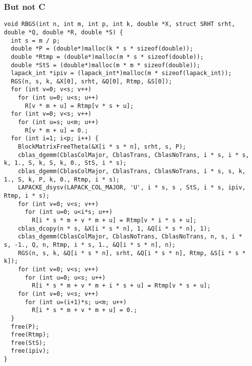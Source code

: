 \documentclass[t,usepdftitle=false]{beamer}
\begin{document}
\begin{frame}[fragile]
	\frametitle{But not C}
	\tiny
\begin{verbatim}
void RBGS(int n, int m, int p, int k, double *X, struct SRHT srht, double *Q, double *R, double *S) {
  int s = m / p;
  double *P = (double*)malloc(k * s * sizeof(double));
  double *Rtmp = (double*)malloc(m * s * sizeof(double));
  double *StS = (double*)malloc(m * m * sizeof(double));
  lapack_int *ipiv = (lapack_int*)malloc(m * sizeof(lapack_int));
  RGS(n, s, k, &X[0], srht, &Q[0], Rtmp, &S[0]);
  for (int v=0; v<s; v++)
    for (int u=0; u<s; u++)
      R[v * m + u] = Rtmp[v * s + u];
  for (int v=0; v<s; v++)
    for (int u=s; u<m; u++)
      R[v * m + u] = 0.;
  for (int i=1; i<p; i++) {
    BlockMatrixFreeTheta(&X[i * s * n], srht, s, P);
    cblas_dgemm(CblasColMajor, CblasTrans, CblasNoTrans, i * s, i * s, k, 1., S, k, S, k, 0., StS, i * s);
    cblas_dgemm(CblasColMajor, CblasTrans, CblasNoTrans, i * s, s, k, 1., S, k, P, k, 0., Rtmp, i * s);
    LAPACKE_dsysv(LAPACK_COL_MAJOR, 'U', i * s, s , StS, i * s, ipiv, Rtmp, i * s);
    for (int v=0; v<s; v++)
      for (int u=0; u<i*s; u++)
        R[i * s * m + v * m + u] = Rtmp[v * i * s + u];
    cblas_dcopy(n * s, &X[i * s * n], 1, &Q[i * s * n], 1);
    cblas_dgemm(CblasColMajor, CblasNoTrans, CblasNoTrans, n, s, i * s, -1., Q, n, Rtmp, i * s, 1., &Q[i * s * n], n);
    RGS(n, s, k, &Q[i * s * n], srht, &Q[i * s * n], Rtmp, &S[i * s * k]);
    for (int v=0; v<s; v++)
      for (int u=0; u<s; u++)
        R[i * s * m + v * m + i * s + u] = Rtmp[v * s + u];
    for (int v=0; v<s; v++)
      for (int u=(i+1)*s; u<m; u++)
        R[i * s * m + v * m + u] = 0.;
  }
  free(P);
  free(Rtmp);
  free(StS);
  free(ipiv);
}
\end{verbatim}
\end{frame} 
\end{document}
